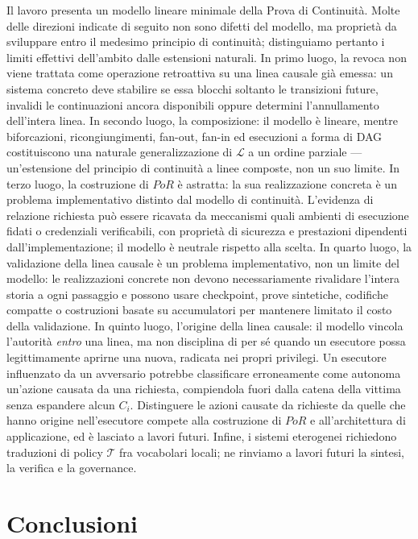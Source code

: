 \documentclass[11pt]{article}
\begin{document}
Il lavoro presenta un modello lineare minimale della Prova di Continuità. Molte
delle direzioni indicate di seguito non sono difetti del modello, ma proprietà
da sviluppare entro il medesimo principio di continuità; distinguiamo pertanto i
limiti effettivi dell'ambito dalle estensioni naturali. In primo luogo, la revoca
non viene trattata come operazione retroattiva su una linea causale già emessa:
un sistema concreto deve stabilire se essa blocchi soltanto le transizioni
future, invalidi le continuazioni ancora disponibili oppure determini
l'annullamento dell'intera linea. In secondo luogo, la composizione: il modello
è lineare, mentre biforcazioni, ricongiungimenti, fan-out, fan-in ed esecuzioni a
forma di DAG costituiscono una naturale generalizzazione di $\mathcal{L}$ a un
ordine parziale --- un'estensione del principio di continuità a linee composte,
non un suo limite. In terzo luogo, la costruzione di $PoR$ è astratta: la sua
realizzazione concreta è un problema implementativo distinto dal modello di
continuità. L'evidenza di relazione richiesta può essere ricavata da meccanismi
quali ambienti di esecuzione fidati o credenziali verificabili, con proprietà di
sicurezza e prestazioni dipendenti dall'implementazione; il modello è neutrale
rispetto alla scelta.
In quarto luogo, la validazione della linea causale è un problema implementativo,
non un limite del modello: le realizzazioni concrete non devono necessariamente
rivalidare l'intera storia a ogni passaggio e possono usare checkpoint, prove
sintetiche, codifiche compatte o costruzioni basate su accumulatori per mantenere
limitato il costo della validazione.
In quinto luogo, l'origine della linea causale: il modello vincola l'autorità
\emph{entro} una linea, ma non disciplina di per sé quando un esecutore possa
legittimamente aprirne una nuova, radicata nei propri privilegi. Un esecutore
influenzato da un avversario potrebbe classificare erroneamente come autonoma
un'azione causata da una richiesta, compiendola fuori dalla catena della vittima
senza espandere alcun $C_i$. Distinguere le azioni causate da richieste da quelle
che hanno origine nell'esecutore compete alla costruzione di $PoR$ e
all'architettura di applicazione, ed è lasciato a lavori futuri.
Infine, i sistemi eterogenei richiedono traduzioni di policy $\mathcal{T}$ fra
vocabolari locali; ne rinviamo a lavori futuri la sintesi, la verifica e la
governance.

\section{Conclusioni}
\end{document}
